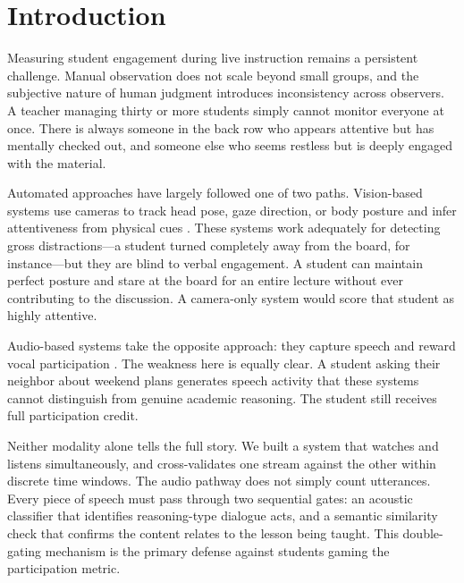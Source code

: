 \documentclass[conference]{IEEEtran}
\begin{document}
\section{Introduction}
Measuring student engagement during live instruction remains a persistent challenge. Manual observation does not scale beyond small groups, and the subjective nature of human judgment introduces inconsistency across observers. A teacher managing thirty or more students simply cannot monitor everyone at once. There is always someone in the back row who appears attentive but has mentally checked out, and someone else who seems restless but is deeply engaged with the material.

Automated approaches have largely followed one of two paths. Vision-based systems use cameras to track head pose, gaze direction, or body posture and infer attentiveness from physical cues \cite{b8}. These systems work adequately for detecting gross distractions---a student turned completely away from the board, for instance---but they are blind to verbal engagement. A student can maintain perfect posture and stare at the board for an entire lecture without ever contributing to the discussion. A camera-only system would score that student as highly attentive.

Audio-based systems take the opposite approach: they capture speech and reward vocal participation \cite{b4}. The weakness here is equally clear. A student asking their neighbor about weekend plans generates speech activity that these systems cannot distinguish from genuine academic reasoning. The student still receives full participation credit.

Neither modality alone tells the full story. We built a system that watches and listens simultaneously, and cross-validates one stream against the other within discrete time windows. The audio pathway does not simply count utterances. Every piece of speech must pass through two sequential gates: an acoustic classifier that identifies reasoning-type dialogue acts, and a semantic similarity check that confirms the content relates to the lesson being taught. This double-gating mechanism is the primary defense against students gaming the participation metric.
\end{document}
